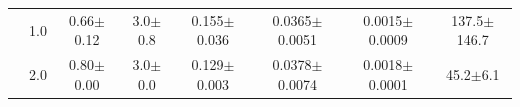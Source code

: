 \begin{tabular}{llcccccc}
 & 1.0 & \cellcolor{warnorange}0.66$\pm$0.12 & \cellcolor{goodgreen}3.0$\pm$0.8 & \cellcolor{warnorange}0.155$\pm$0.036 & \cellcolor{warnorange}0.0365$\pm$0.0051 & \cellcolor{goodgreen}0.0015$\pm$0.0009 & 137.5$\pm$146.7 \\
 & 2.0 & \cellcolor{goodgreen}0.80$\pm$0.00 & \cellcolor{goodgreen}3.0$\pm$0.0 & \cellcolor{goodgreen}0.129$\pm$0.003 & \cellcolor{warnorange}0.0378$\pm$0.0074 & \cellcolor{goodgreen}0.0018$\pm$0.0001 & 45.2$\pm$6.1 \\
\hline
\end{tabular}
